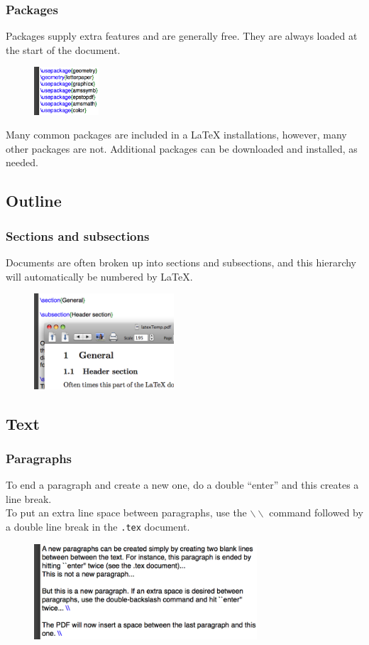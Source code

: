\documentclass[slidestop,compress,mathserif]{beamer}
\begin{document}
\begin{frame} \frametitle{Packages}
Packages supply extra features and are generally free. They are always loaded at the start of the document. \\
\begin{figure}[htbp]
   \centering
   \includegraphics[height=0.7in]{basicsOfLatex/general/packages}
\end{figure}
Many common packages are included in a LaTeX installations, however, many other packages are not. Additional packages can be downloaded and installed, as needed.
\end{frame}

\subsection[Outline]{Outline}
\begin{frame} \frametitle{Sections and subsections}
Documents are often broken up into sections and subsections, and this hierarchy will automatically be numbered by LaTeX.
\begin{figure}[htbp]
   \centering
   \includegraphics[height=1.4in]{basicsOfLatex/general/sectionsSubsections}
\end{figure}
\end{frame}

\subsection[Text]{Text}
\begin{frame} \frametitle{Paragraphs}
To end a paragraph and create a new one, do a double ``{\color{highlight}enter}'' and this creates a line break. \\
\vspace{0.5cm}
To put an extra line space between paragraphs, use the \texttt{\color{command}$\backslash\backslash$} command followed by a double line break in the \texttt{.tex} document.
\begin{figure}[htbp]
   \centering
   \includegraphics[height=1.4in]{basicsOfLatex/general/paragraphSpacing}
\end{figure}
\end{frame}
\end{document}
